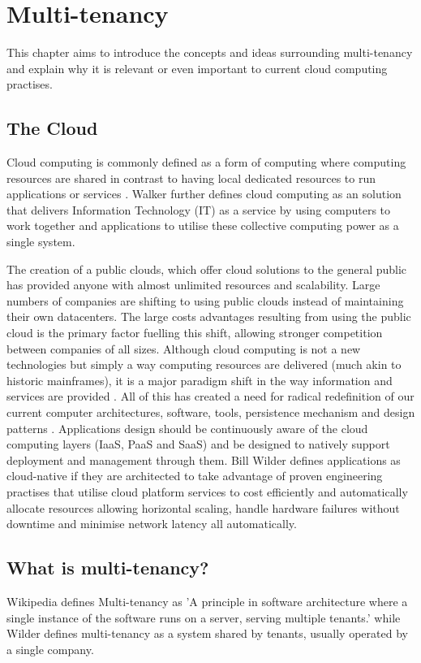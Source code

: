 \chapter{Multi-tenancy}
This chapter aims to introduce the concepts and ideas surrounding multi-tenancy and explain why it is relevant or even important to current cloud computing practises.

\section{The Cloud}
Cloud computing is commonly defined as a form of computing where computing resources are shared  in contrast to having local dedicated resources to run applications or services \cite{webopedia}. Walker \cite{GraceWalker} further defines cloud computing as an solution that delivers Information Technology (IT) as a service by using computers to work together and applications to utilise these collective computing power as a single system. 

The creation of a public clouds, which offer cloud solutions to the general public has provided anyone with almost unlimited resources and scalability. Large numbers of companies are shifting to using public clouds instead of maintaining their own datacenters. The large costs advantages resulting from using the public cloud is the primary factor fuelling this shift, allowing stronger competition between companies of all sizes. Although cloud computing is not a new technologies but simply a way computing resources are delivered (much akin to historic mainframes), it is a major paradigm shift in the way information and services are provided \cite{GraceWalker}. All of this has created a need for radical redefinition of our current computer architectures, software, tools, persistence mechanism and design patterns \cite{GraceWalker}. Applications design should be continuously aware of the cloud computing layers (IaaS, PaaS and SaaS) and be designed to natively support deployment and management through them. Bill Wilder \cite{Wilder2012-so} defines applications as cloud-native if they are architected to take advantage of proven engineering practises that utilise cloud platform services to cost efficiently and automatically allocate resources allowing horizontal scaling, handle hardware failures without downtime and minimise network latency all automatically. 


\section{What is multi-tenancy?}
Wikipedia   defines Multi-tenancy as 'A principle in software architecture where a single instance of the software runs on a server, serving multiple tenants.'  while Wilder \cite{Wilder2012-so} defines multi-tenancy as a system shared by tenants, usually operated by a single company. 

